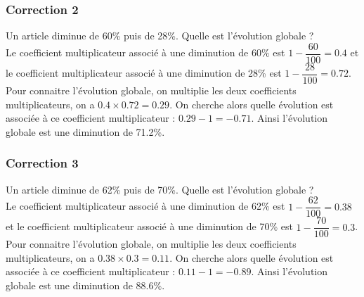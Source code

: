 \documentclass[15pt, mathserif]{beamer}
\begin{document}
\begin{frame}
\vspace{-10mm}
	\frametitle{Correction 2}
\vspace*{1cm} Un article diminue de 60\% puis de 28\%. Quelle est l'évolution globale ? \\ Le coefficient multiplicateur associé à une diminution de 60\% est $1-\dfrac{60}{100} = 0.4$ et le coefficient multiplicateur associé à une diminution de 28\% est $1-\dfrac{28}{100} = 0.72$. Pour connaitre l'évolution globale, on multiplie les deux coefficients multiplicateurs, on a $ 0.4 \times 0.72=0.29$. On cherche alors quelle évolution est associée à ce coefficient multiplicateur : $0.29-1 =-0.71$. Ainsi l'évolution globale est une diminution de 71.2\%. 
 \begin{center} 
 \end{center}\end{frame}


\begin{frame}
\vspace{-10mm}
	\frametitle{Correction 3}
\vspace*{1cm} Un article diminue de 62\% puis de 70\%. Quelle est l'évolution globale ? \\ Le coefficient multiplicateur associé à une diminution de 62\% est $1-\dfrac{62}{100} = 0.38$ et le coefficient multiplicateur associé à une diminution de 70\% est $1-\dfrac{70}{100} = 0.3$. Pour connaitre l'évolution globale, on multiplie les deux coefficients multiplicateurs, on a $ 0.38 \times 0.3=0.11$. On cherche alors quelle évolution est associée à ce coefficient multiplicateur : $0.11-1 =-0.89$. Ainsi l'évolution globale est une diminution de 88.6\%. 
 \begin{center} 
 \end{center}\end{frame}
\end{document}
